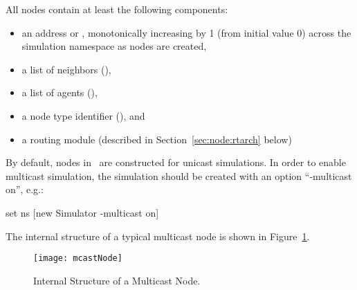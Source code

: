 All nodes contain at least the following components:
\begin{itemize}
\item an address or , monotonically increasing by 1 (from 
initial value 0) across the simulation namespace as nodes are created,
\item a list of neighbors (),
\item a list of agents (),
\item a node type identifier (), and
\item a routing module (described in Section~\ref{sec:node:rtarch} below)
\end{itemize}


% 

By default, nodes in \ns\ are constructed for unicast simulations.
In order to enable multicast simulation, the simulation should be created 
with an option ``-multicast on'', e.g.:
\begin{program}
        set ns [new Simulator -multicast on]
\end{program}
The internal structure of a typical multicast node is shown in
Figure~\ref{fig:node:multicast}.
\begin{figure}
  \centerline{\texttt{[image: mcastNode]}}
  \caption{Internal Structure of a Multicast Node.}
  \label{fig:node:multicast}
\end{figure}

